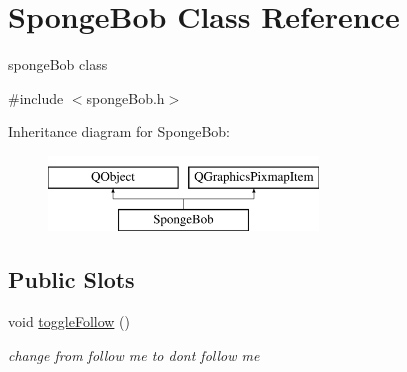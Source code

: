 \hypertarget{classSpongeBob}{\section{Sponge\-Bob Class Reference}
\label{classSpongeBob}
}


sponge\-Bob class  




{\ttfamily \#include $<$sponge\-Bob.\-h$>$}

Inheritance diagram for Sponge\-Bob\-:\begin{figure}[H]
\begin{center}
\leavevmode
\includegraphics[height=2.000000cm]{classSpongeBob}
\end{center}
\end{figure}
\subsection*{Public Slots}
\begin{DoxyCompactItemize}
\item 
void \hyperlink{classSpongeBob_aabcc0812bd3801612c5328004748cc12}{toggle\-Follow} ()
\begin{DoxyCompactList}\small\item\em change from follow me to dont follow me \end{DoxyCompactList}\end{DoxyCompactItemize}
